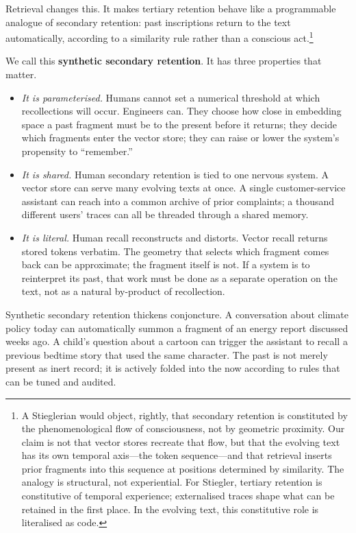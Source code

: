 \documentclass[12pt,a4paper]{article}
\begin{document}
Retrieval changes this. It makes tertiary retention behave like a programmable analogue of secondary retention: past inscriptions return to the text automatically, according to a similarity rule rather than a conscious act.\footnote{A Stieglerian would object, rightly, that secondary retention is constituted by the phenomenological flow of consciousness, not by geometric proximity. Our claim is not that vector stores recreate that flow, but that the evolving text has its own temporal axis---the token sequence---and that retrieval inserts prior fragments into this sequence at positions determined by similarity. The analogy is structural, not experiential. For Stiegler, tertiary retention is constitutive of temporal experience; externalised traces shape what can be retained in the first place. In the evolving text, this constitutive role is literalised as code.}

We call this \textbf{synthetic secondary retention}. It has three properties that matter.

\begin{itemize}
  \item \emph{It is parameterised.} Humans cannot set a numerical threshold at which recollections will occur. Engineers can. They choose how close in embedding space a past fragment must be to the present before it returns; they decide which fragments enter the vector store; they can raise or lower the system's propensity to ``remember.''

  \item \emph{It is shared.} Human secondary retention is tied to one nervous system. A vector store can serve many evolving texts at once. A single customer-service assistant can reach into a common archive of prior complaints; a thousand different users' traces can all be threaded through a shared memory.

  \item \emph{It is literal.} Human recall reconstructs and distorts. Vector recall returns stored tokens verbatim. The geometry that selects which fragment comes back can be approximate; the fragment itself is not. If a system is to reinterpret its past, that work must be done as a separate operation on the text, not as a natural by-product of recollection.
\end{itemize}

Synthetic secondary retention thickens conjoncture. A conversation about climate policy today can automatically summon a fragment of an energy report discussed weeks ago. A child's question about a cartoon can trigger the assistant to recall a previous bedtime story that used the same character. The past is not merely present as inert record; it is actively folded into the now according to rules that can be tuned and audited.
\end{document}
